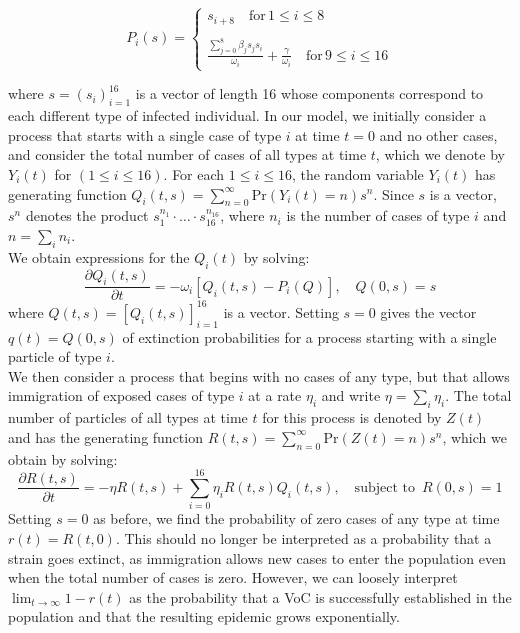 \documentclass{article}
\begin{document}
\begin{equation} \label{offspring}
P_i(s) =  \begin{cases}
 s_{i+8} \quad \text{for} \, 1 \leq i \leq 8 \\
\\
\frac{\sum_{j=0}^8 \beta_j s_j s_i}{\omega_i} + \frac{\gamma}{\omega_i} \quad \text{for} \, 9 \leq i \leq 16 
\end{cases}
\end{equation}


where $s = (s_i)_{i=1}^{16}$ is a vector of length 16 whose components correspond to each different type of infected individual. In our model, we initially consider a process that starts with a single case of type $i$ at time $t=0$ and no other cases, and consider the total number of cases of all types at time $t$, which we denote by $Y_i(t)$ for $ (1 \leq i \leq 16)$.  For each $1 \leq i \leq 16$, the random variable $Y_i(t)$ has generating function $Q_i(t, s) = \sum_{n=0}^\infty{\mathrm{Pr}}(Y_i(t) = n)s^n$. Since $s$ is a vector, $s^n$ denotes the product $s_1^{n_1} \cdot \dots \cdot s_{16}^{n_{16}}$, where $n_i$ is the number of cases of type $i$ and $n = \sum_i n_i$. \\ 

We obtain expressions for the $Q_i(t)$ by solving:
\begin{equation}
    \frac{\partial Q_i(t, s)}{\partial t} = -\omega_i[Q_i(t, s) - P_i(Q)], \quad Q(0, s) = s \label{Qeq}
\end{equation}
where $Q(t, s) = [Q_i(t, s)]_{i=1}^{16}$ is a vector. Setting $s=0$ gives the vector  $q(t) = Q(0, s)$ of extinction probabilities for a process starting with a single particle of type $i$. \\

We then consider a process that begins with no cases of any type, but that allows immigration of exposed cases of type $i$ at a rate $\eta_i$ and write $\eta = \sum_i \eta_i$. The total number of particles of all types at time $t$ for this process is denoted by $Z(t)$ and has the generating function $R(t, s) = \sum_{n=0}^\infty {\mathrm{Pr}}(Z(t) = n)s^n$, which we obtain by solving:
\begin{equation}
    \frac{\partial R(t, s)}{\partial t} = -\eta R(t, s) + \sum_{i=0}^{16} \eta_i R(t, s)Q_i(t, s), \quad \text{subject to }\, R(0, s) = 1 \label{Req}
\end{equation}
Setting $s=0$ as before, we find the probability of zero cases of any type at time $r(t) = R(t, 0)$. This should no longer be interpreted as a probability that a strain goes extinct, as immigration allows new cases to enter the population even when the total number of cases is zero. However, we can loosely interpret $\lim_{t \to \infty}1 - r(t)$ as the probability that a VoC is successfully established in the population and that the resulting epidemic grows exponentially. 
\end{document}
